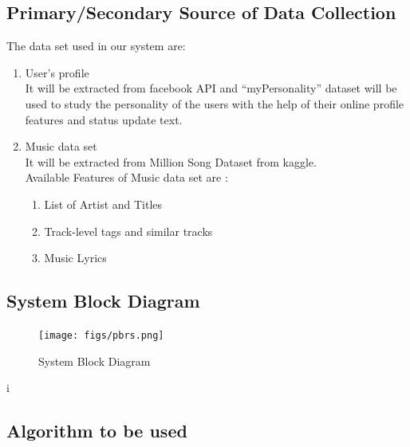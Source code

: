 \documentclass[a4paper,12pt]{article}
\begin{document}
\subsection{Primary/Secondary Source of Data Collection}
The data set used in our system are:
\begin{enumerate}
\item User's profile\\
  It will be extracted from facebook API and ``myPersonality'' dataset will be used to study the personality of the users with the help of their online profile features and status update text.
\item Music data set\\
  It will be extracted from Million Song Dataset from kaggle. \\
  Available Features of Music data set are :
  \begin{enumerate}
  \item List of Artist and Titles
  \item Track-level tags and similar tracks
  \item Music Lyrics
  \end{enumerate}
\end{enumerate}

\subsection{System Block Diagram}
\begin{figure}[ht!]
  \centering
  \texttt{[image: figs/pbrs.png]}
  \caption{System Block Diagram \label{fig:pbrs}}
\end{figure}
i
\subsection{Algorithm to be used}
\end{document}
